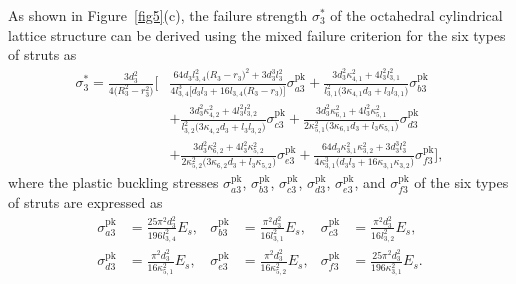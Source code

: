 \documentclass[12pt,a4paper]{article}
\begin{document}
	
As shown in Figure~\ref{fig5}(c), the failure strength $\sigma_3^*$ of the octahedral cylindrical lattice structure can be derived using the mixed failure criterion for the six types of struts as
%
\begin{equation}
	\begin{aligned}
		\sigma_3^*
		=
		\frac{3d_3^2}{4\bigl(R_3^2-r_3^2\bigr)}
		\Bigg[
		&\frac{
			64d_3l_{3,4}^2\bigl(R_3-r_3\bigr)^2
			+3d_3^3l_3^2
		}{
			4l_{3,4}^3
			\bigl[
			d_3l_3+16l_{3,4}\bigl(R_3-r_3\bigr)
			\bigr]
		}
		\sigma_{a3}^{\mathrm{pk}}
		+
		\frac{
			3d_3^2\kappa_{4,1}^2
			+4l_3^2l_{3,1}^2
		}{
			l_{3,1}^2
			\bigl(
			3\kappa_{4,1}d_3+l_3l_{3,1}
			\bigr)
		}
		\sigma_{b3}^{\mathrm{pk}}
		\\
		&+
		\frac{
			3d_3^2\kappa_{4,2}^2
			+4l_3^2l_{3,2}^2
		}{
			l_{3,2}^2
			\bigl(
			3\kappa_{4,2}d_3+l_3l_{3,2}
			\bigr)
		}
		\sigma_{c3}^{\mathrm{pk}}
		+
		\frac{
			3d_3^2\kappa_{6,1}^2
			+4l_3^2\kappa_{5,1}^2
		}{
			2\kappa_{5,1}^2
			\bigl(
			3\kappa_{6,1}d_3+l_3\kappa_{5,1}
			\bigr)
		}
		\sigma_{d3}^{\mathrm{pk}}
		\\
		&+
		\frac{
			3d_3^2\kappa_{6,2}^2
			+4l_3^2\kappa_{5,2}^2
		}{
			2\kappa_{5,2}^2
			\bigl(
			3\kappa_{6,2}d_3+l_3\kappa_{5,2}
			\bigr)
		}
		\sigma_{e3}^{\mathrm{pk}}
		+
		\frac{
			64d_3\kappa_{3,1}^2\kappa_{3,2}^2
			+3d_3^3l_3^2
		}{
			4\kappa_{3,1}^3
			\bigl(
			d_3l_3+16\kappa_{3,1}\kappa_{3,2}
			\bigr)
		}
		\sigma_{f3}^{\mathrm{pk}}
		\Bigg],
	\end{aligned}
	\label{Eq28}
\end{equation}
%
%
where the plastic buckling stresses $\sigma_{a3}^{\mathrm{pk}}$, $\sigma_{b3}^{\mathrm{pk}}$, $\sigma_{c3}^{\mathrm{pk}}$, $\sigma_{d3}^{\mathrm{pk}}$, $\sigma_{e3}^{\mathrm{pk}}$, and $\sigma_{f3}^{\mathrm{pk}}$ of the six types of struts are expressed as
%
\[
\begin{aligned}
	\sigma_{a3}^{\mathrm{pk}}
	&=
	\frac{25\pi^2d_3^2}{196l_{3,4}^2}E_s, &
	\sigma_{b3}^{\mathrm{pk}}
	&=
	\frac{\pi^2d_3^2}{16l_{3,1}^2}E_s, &
	\sigma_{c3}^{\mathrm{pk}}
	&=
	\frac{\pi^2d_3^2}{16l_{3,2}^2}E_s, \\[0.5em]
	\sigma_{d3}^{\mathrm{pk}}
	&=
	\frac{\pi^2d_3^2}{16\kappa_{5,1}^2}E_s, &
	\sigma_{e3}^{\mathrm{pk}}
	&=
	\frac{\pi^2d_3^2}{16\kappa_{5,2}^2}E_s, &
	\sigma_{f3}^{\mathrm{pk}}
	&=
	\frac{25\pi^2d_3^2}{196\kappa_{3,1}^2}E_s .
\end{aligned}
\]
\end{document}
